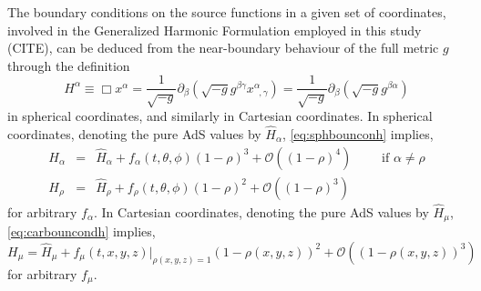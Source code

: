 \documentclass[a4paper,11pt]{article}
\begin{document}
The boundary conditions on the source functions in a given set of coordinates, involved in the Generalized Harmonic Formulation employed in this study (CITE), can be deduced from the near-boundary behaviour of the full metric $g$ through the definition 
\begin{equation}\label{eq:defsoufunsph}
H^\alpha \equiv \Box x^\alpha = \frac{1}{\sqrt{-g}}\partial_\beta (\sqrt{-g}g^{\beta\gamma}x^\alpha_{\;\;,\gamma})=\frac{1}{\sqrt{-g}}\partial_\beta (\sqrt{-g}g^{\beta\alpha})
\end{equation}
in spherical coordinates, and similarly in Cartesian coordinates. 
In spherical coordinates, denoting the pure AdS values by $\hat{H}_\alpha$, \eqref{eq:sphbounconh} implies,
\begin{eqnarray}\label{eq:sphbouncondsoufunc}
H_\alpha&=&\hat{H}_\alpha+f_\alpha(t,\theta,\phi)(1-\rho)^3+\mathcal{O}((1-\rho)^4) \qquad \textrm{ if $\alpha\neq\rho$} \\ \nonumber
H_\rho&=&\hat{H}_\rho+f_\rho(t,\theta,\phi)(1-\rho)^2+\mathcal{O}((1-\rho)^3)
\end{eqnarray}
for arbitrary $f_\alpha$.
In Cartesian coordinates,  denoting the pure AdS values by $\hat{H}_\mu$, \eqref{eq:carbouncondh} implies,
\begin{equation}\label{eq:carbouncondsoufun}
H_\mu=\hat{H}_\mu+f_\mu(t,x,y,z)|_{\rho(x,y,z)=1}(1-\rho(x,y,z))^2+\mathcal{O}((1-\rho(x,y,z))^3)
\end{equation}
for arbitrary $f_\mu$.




\end{document}
